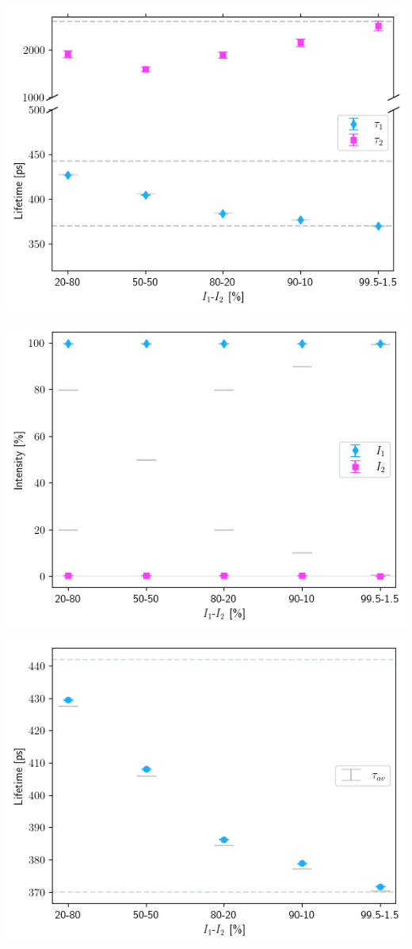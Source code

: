 \begin{minipage}{.47\linewidth}
     
    \includegraphics[width=\linewidth]{Batch 6/2-life/lifetimes.png}
    \label{fig:370-440-2life}
\end{minipage}
\hfill
\begin{minipage}{.47\linewidth}
     
    \includegraphics[width=\linewidth]{Batch 6/2-life/intensities.png}
    \label{fig:370-440-2lifeint}
\end{minipage}
\begin{minipage}{\linewidth}
     
    \includegraphics[width= .47\linewidth]{Batch 6/1-life/lifetime.png}
    \label{fig:370-440-1life}
\end{minipage}



